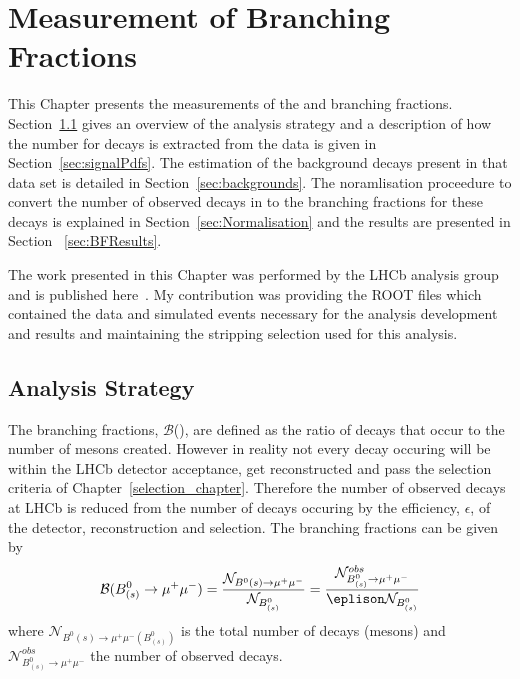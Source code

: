\chapter{Measurement of \bmumu Branching Fractions}
\label{sec:BFanalysis}
This Chapter presents the measurements of the \bdmumu and \bsmumu branching fractions. Section~\ref{sec:BFAnalysisStrategy} gives an overview of the analysis strategy and a description of how the number for \bmumu decays is extracted from the data is given in Section~\ref{sec:signalPdfs}. The estimation of the background decays present in that data set is detailed in Section~\ref{sec:backgrounds}. The noramlisation proceedure to convert the number of observed \bmumu decays in to the branching fractions for these decays is explained in Section~\ref{sec:Normalisation} and the results are presented in Section ~\ref{sec:BFResults}. 

The work presented in this Chapter was performed by the \bmumu LHCb analysis group and is published here~\cite{}. My contribution was providing the ROOT files which contained the data and simulated events necessary for the analysis development and results and maintaining the stripping selection used for this analysis.

\section{Analysis Strategy} 
\label{sec:BFAnalysisStrategy}
The \bmumu branching fractions, $\mathcal{B}$(\bmumu), are defined as the ratio of \bmumu decays that occur to the number of \bsd mesons created. However in reality not every \bmumu decay occuring will be within the LHCb detector acceptance, get reconstructed and pass the selection criteria of Chapter~\ref{selection_chapter}. Therefore the number of observed \bmumu decays at LHCb is reduced from the number of \bmumu decays occuring by the efficiency, $\epsilon$, of the detector, reconstruction and selection.
The \bmumu branching fractions can be given by
\begin{equation}
\mathcal{B}(B^{0}_{(s)} \to \mu^{+} \mu^{-}) = \frac{\mathcal{N}_{B^{0}{(s)} \to \mu^{+} \mu^{-}}}{\mathcal{N}_{B^{0}_{(s)}}} = \frac{\mathcal{N}^{obs}_{B^{0}_{(s)} \to \mu^{+} \mu^{-}}}{\eplison \mathcal{N}_{B^{0}_{(s)}}}
\label{eq:BFdef}
\end{equation}
where $\mathcal{N}_{B^{0}{(s)} \to \mu^{+} \mu^{-}(B^{0}_{(s)})}$ is the total number of \bmumu decays (\bsd mesons) and $\mathcal{N}^{obs}_{B^{0}_{(s)} \to \mu^{+} \mu^{-}}$ the number of observed \bmumu decays.


